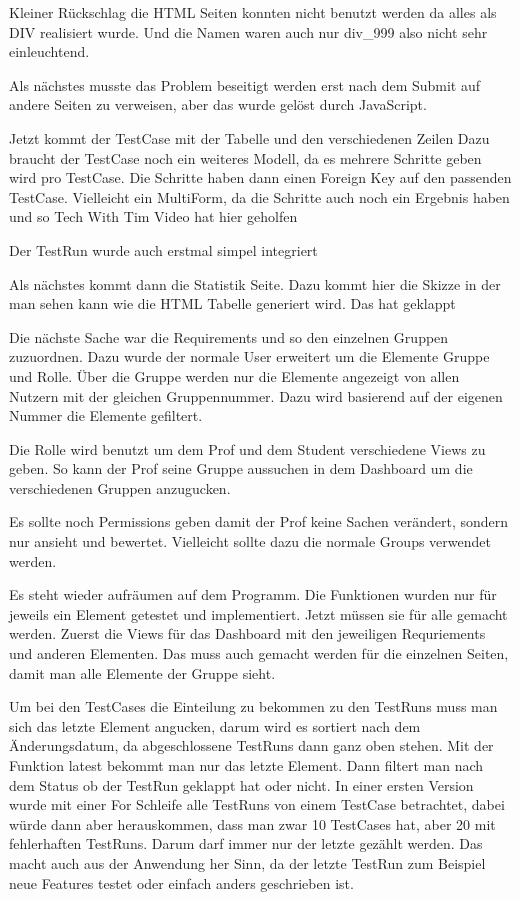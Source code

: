 \documentclass[11pt,a4paper]{report}
\begin{document}
Kleiner Rückschlag die HTML Seiten konnten nicht benutzt werden da alles als DIV realisiert wurde. Und die Namen waren auch nur div\_999 also nicht sehr einleuchtend. 

Als nächstes musste das Problem beseitigt werden erst nach dem Submit auf andere Seiten zu verweisen, aber das wurde gelöst durch JavaScript.

Jetzt kommt der TestCase mit der Tabelle und den verschiedenen Zeilen
Dazu braucht der TestCase noch ein weiteres Modell, da es mehrere Schritte geben wird pro TestCase. Die Schritte haben dann einen Foreign Key auf den passenden TestCase.
Vielleicht ein MultiForm, da die Schritte auch noch ein Ergebnis haben und so
Tech With Tim Video hat hier geholfen 

Der TestRun wurde auch erstmal simpel integriert


Als nächstes kommt dann die Statistik Seite. Dazu kommt hier die Skizze in der man sehen kann wie die HTML Tabelle generiert wird.
Das hat geklappt

Die nächste Sache war die Requirements und so den einzelnen Gruppen zuzuordnen. Dazu wurde der normale User erweitert um die Elemente Gruppe und Rolle. Über die Gruppe werden nur die Elemente angezeigt von allen Nutzern mit der gleichen Gruppennummer. Dazu wird basierend auf der eigenen Nummer die Elemente gefiltert. 

Die Rolle wird benutzt um dem Prof und dem Student verschiedene Views zu geben. So kann der Prof seine Gruppe aussuchen in dem Dashboard um die verschiedenen Gruppen anzugucken.

Es sollte noch Permissions geben damit der Prof keine Sachen verändert, sondern nur ansieht und bewertet. Vielleicht sollte dazu die normale Groups verwendet werden.


Es steht wieder aufräumen auf dem Programm. Die Funktionen wurden nur für jeweils ein Element getestet und implementiert. Jetzt müssen sie für alle gemacht werden.
Zuerst die Views für das Dashboard mit den jeweiligen Requriements und anderen Elementen. Das muss auch gemacht werden für die einzelnen Seiten, damit man alle Elemente der Gruppe sieht.

Um bei den TestCases die Einteilung zu bekommen zu den TestRuns muss man sich das letzte Element angucken, darum wird es sortiert nach dem Änderungsdatum, da abgeschlossene TestRuns dann ganz oben stehen. Mit der Funktion latest bekommt man nur das letzte Element. Dann filtert man nach dem Status ob der TestRun geklappt hat oder nicht. 
In einer ersten Version wurde mit einer For Schleife alle TestRuns von einem TestCase betrachtet, dabei würde dann aber herauskommen, dass man zwar 10 TestCases hat, aber 20 mit fehlerhaften TestRuns. Darum darf immer nur der letzte gezählt werden.
Das macht auch aus der Anwendung her Sinn, da der letzte TestRun zum Beispiel neue Features testet oder einfach anders geschrieben ist.
\end{document}
